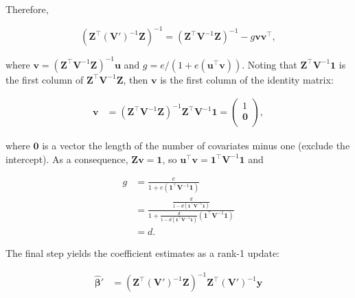 \documentclass[11pt]{article}
\begin{document}
\begin{linenumbers}
\begin{appendices}
  Therefore, 
  \begin{linenomath*}
  $$
  \left( \mathbf{Z}^\intercal \left( \mathbf{V}' \right)^{-1} \mathbf{Z} \right)^{-1}
  =
  \left( \mathbf{Z}^\intercal \mathbf{V}^{-1} \mathbf{Z} \right)^{-1}
  - g \mathbf{v} \mathbf{v}^\intercal
  ,
  $$
  \end{linenomath*}
  where $\mathbf{v} = \left( \mathbf{Z}^\intercal \mathbf{V}^{-1} \mathbf{Z} \right)^{-1} \mathbf{u}$
  and $g = e/(1 + e (\mathbf{u}^\intercal \mathbf{v}))$.
  Noting that $\mathbf{Z}^\intercal \mathbf{V}^{-1} \mathbf{1}$ is the first column of $\mathbf{Z}^\intercal \mathbf{V}^{-1} \mathbf{Z}$, then $\mathbf{v}$ is the first column of the identity matrix:
  \begin{linenomath*}
  \begin{align*}
    \mathbf{v}
    &=
      \left( \mathbf{Z}^\intercal \mathbf{V}^{-1} \mathbf{Z} \right)^{-1} \mathbf{Z}^\intercal \mathbf{V}^{-1} \mathbf{1}
      =
      \begin{pmatrix}
        1 \\
        \mathbf{0} \\
      \end{pmatrix}
      ,
  \end{align*}
  \end{linenomath*}
  where $\mathbf{0}$ is a vector the length of the number of covariates minus one (exclude the intercept).
  As a consequence, $\mathbf{Z} \mathbf{v} = \mathbf{1}$, so $\mathbf{u}^\intercal \mathbf{v} = \mathbf{1}^\intercal \mathbf{V}^{-1} \mathbf{1}$ and
  \begin{linenomath*}
  \begin{align*}
    g
    &=
      \frac{ e } {1 + e (\mathbf{1}^\intercal \mathbf{V}^{-1} \mathbf{1}) }
    \\
    &=
      \frac{
      \frac{ d }{ 1 - d \left( \mathbf{1}^\intercal \mathbf{V}^{-1} \mathbf{1} \right) }
      } {
      1 + \frac{ d }{ 1 - d \left( \mathbf{1}^\intercal \mathbf{V}^{-1} \mathbf{1} \right) } (\mathbf{1}^\intercal \mathbf{V}^{-1} \mathbf{1})
      }
    \\
    &=
      d
      .
  \end{align*}
  \end{linenomath*}
  The final step yields the coefficient estimates as a rank-1 update:
  \begin{linenomath*}
  \begin{align*}
    \boldsymbol{\hat{\beta}}'
    &=
      \left( \mathbf{Z}^\intercal \left( \mathbf{V}' \right) ^{-1} \mathbf{Z} \right)^{-1} \mathbf{Z}^\intercal \left( \mathbf{V}' \right)^{-1} \mathbf{y}

\end{align*}
\end{linenomath*}
\end{appendices}
\end{linenumbers}
\end{document}
